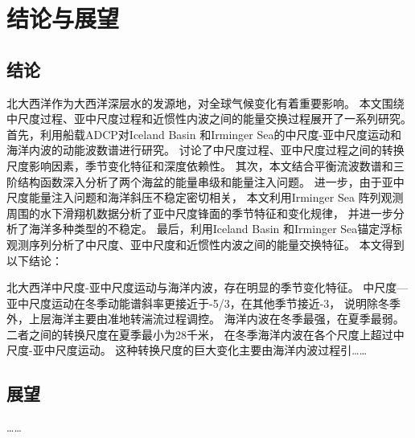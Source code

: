 \chapter{结论与展望}

\section{结论}

北大西洋作为大西洋深层水的发源地，对全球气候变化有着重要影响\cite{li2015greenland}。
本文围绕中尺度过程、亚中尺度过程和近惯性内波之间的能量交换过程展开了一系列研究。
首先，利用船载ADCP对Iceland Basin 和Irminger Sea的中尺度-亚中尺度运动和海洋内波的动能波数谱进行研究。
讨论了中尺度过程、亚中尺度过程之间的转换尺度影响因素，季节变化特征和深度依赖性。
其次，本文结合平衡流波数谱和三阶结构函数深入分析了两个海盆的能量串级和能量注入问题。
进一步，由于亚中尺度能量注入问题和海洋斜压不稳定密切相关，
本文利用Irminger Sea 阵列观测周围的水下滑翔机数据分析了亚中尺度锋面的季节特征和变化规律，
并进一步分析了海洋多种类型的不稳定。
最后，利用Iceland Basin 和Irminger Sea锚定浮标观测序列分析了中尺度、亚中尺度和近惯性内波之间的能量交换特征。
本文得到以下结论：

北大西洋中尺度-亚中尺度运动与海洋内波，存在明显的季节变化特征。
中尺度—亚中尺度运动在冬季动能谱斜率更接近于-5/3，在其他季节接近-3，
说明除冬季外，上层海洋主要由准地转湍流过程调控。
海洋内波在冬季最强，在夏季最弱。二者之间的转换尺度在夏季最小为28千米，
在冬季海洋内波在各个尺度上超过中尺度-亚中尺度运动。
这种转换尺度的巨大变化主要由海洋内波过程引……  

\section{展望}

……  
